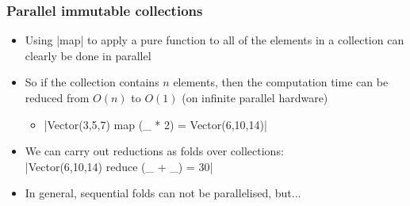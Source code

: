 \documentclass[mathserif,handout]{beamer}
\begin{document}

\begin{frame}[fragile]
  \frametitle{Parallel immutable collections}
  \begin{itemize}
  \item Using |map| to apply a \alert{pure} function to all of the elements in a collection can clearly be done in parallel
  \item So if the collection contains $n$ elements, then the computation time can be reduced from $O(n)$ to $O(1)$ (on infinite parallel hardware)
    \begin{itemize}
    \item |Vector(3,5,7) map (_ * 2) = Vector(6,10,14)|
    \end{itemize}
    \item We can carry out \alert{reductions} as \alert{folds} over collections:\\
      |Vector(6,10,14) reduce (_ + _) = 30|
      \item In general, sequential folds can not be parallelised, but...
  \end{itemize}
\end{frame}
\end{document}
